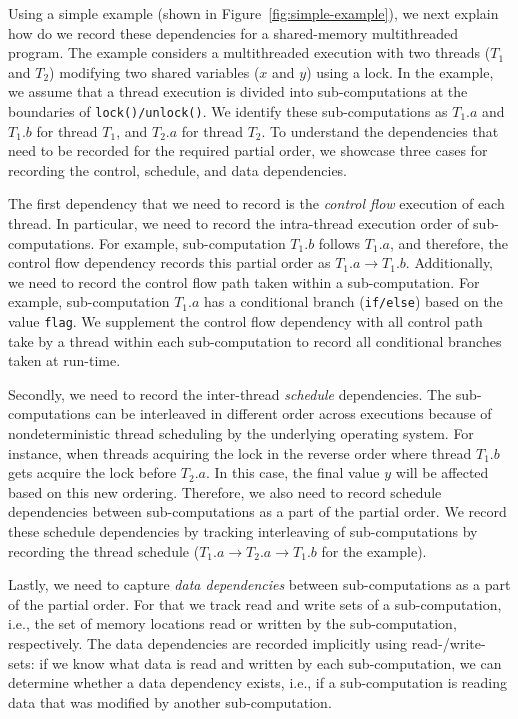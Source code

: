  Using a simple example (shown in Figure~\ref{fig:simple-example}), we next explain how do we record these dependencies for a shared-memory multithreaded program. The example considers a multithreaded execution with two threads ($T_1$ and $T_2$) modifying two shared variables ($x$ and $y$) using a lock. In the example, we assume that a thread execution is divided into sub-computations at the boundaries of {\tt lock()/unlock()}. We identify these sub-computations as $T_1.a$ and $T_1.b$ for thread $T_1$, and $T_2.a$ for thread $T_2$.   To understand the dependencies that need to be recorded for the required partial order, we showcase three cases for recording the control, schedule, and data dependencies.

The first dependency that we need to record is the {\em control flow} execution of each thread. In particular, we need to record the intra-thread execution order of sub-computations. For example, sub-computation $T_1.b$ follows $T_1.a$, and therefore, the control flow dependency records this partial order as $T_1.a \rightarrow T_1.b$. Additionally, we need to record the control flow path taken within a sub-computation. For example, sub-computation  $T_1.a$ has a conditional branch ({\tt if/else}) based on the value {\tt flag}. We supplement the control flow dependency with all control path take by a thread within each sub-computation to record all conditional branches taken at run-time.

Secondly, we need to record the inter-thread {\em schedule} dependencies. The sub-computations can be interleaved in different order across executions because of nondeterministic thread scheduling by the underlying operating system. For instance, when threads acquiring the lock in the reverse order where thread $T_1.b$ gets acquire the lock before $T_2.a$. In this case, the final value $y$ will be affected based on this new ordering. Therefore, we also need to record schedule dependencies between sub-computations as a part of the partial order. We record these schedule dependencies by tracking interleaving of sub-computations by recording the thread schedule ($T_1.a   \rightarrow   T_2.a \rightarrow T_1.b $ for the example).

Lastly,   we need to capture {\em data dependencies} between sub-computations as a part of the partial order. For that we track read and write sets of a sub-computation, i.e., the set of memory locations read or written by the sub-computation, respectively. The data dependencies are recorded implicitly using read-/write-sets: if we know what data is read and written by each sub-computation, we can determine whether a data dependency exists, i.e., if a sub-computation is reading data that was modified by another sub-computation. %



